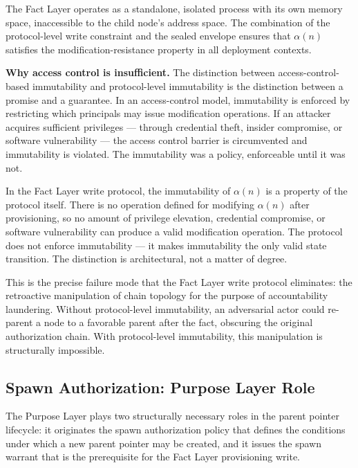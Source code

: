The Fact Layer operates as a standalone, isolated process with its own memory space, inaccessible to the child node's address space. The combination of the protocol-level write constraint and the sealed envelope ensures that $\alpha(n)$ satisfies the modification-resistance property in all deployment contexts.

\medskip
\noindent\textbf{Why access control is insufficient.} The distinction between access-control-based immutability and protocol-level immutability is the distinction between a promise and a guarantee. In an access-control model, immutability is enforced by restricting which principals may issue modification operations. If an attacker acquires sufficient privileges — through credential theft, insider compromise, or software vulnerability — the access control barrier is circumvented and immutability is violated. The immutability was a policy, enforceable until it was not.

In the Fact Layer write protocol, the immutability of $\alpha(n)$ is a property of the protocol itself. There is no operation defined for modifying $\alpha(n)$ after provisioning, so no amount of privilege elevation, credential compromise, or software vulnerability can produce a valid modification operation. The protocol does not enforce immutability — it makes immutability the only valid state transition. The distinction is architectural, not a matter of degree.

This is the precise failure mode that the Fact Layer write protocol eliminates: the retroactive manipulation of chain topology for the purpose of accountability laundering. Without protocol-level immutability, an adversarial actor could re-parent a node to a favorable parent after the fact, obscuring the original authorization chain. With protocol-level immutability, this manipulation is structurally impossible.

\subsection{Spawn Authorization: Purpose Layer Role}
\label{sec:purpose-layer-spawn-authorization}

The Purpose Layer plays two structurally necessary roles in the parent pointer lifecycle: it originates the spawn authorization policy that defines the conditions under which a new parent pointer may be created, and it issues the spawn warrant that is the prerequisite for the Fact Layer provisioning write.

